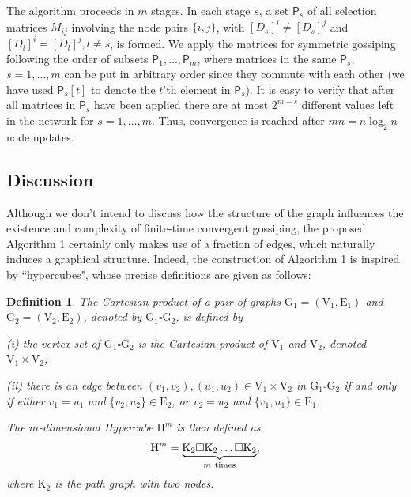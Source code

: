 \documentclass[a4paper, 11pt]{article}
\newtheorem{definition}{Definition}
\begin{document}
The algorithm proceeds in $m$ stages. In each stage $s$, a set $\mathsf{P}_s$ of all selection matrices $M_{ij}$ involving the node pairs  $\{i,j\}$,  with $[D_s]^i \neq [D_s]^j$ and $[D_l]^i=[D_l]^j, l\neq s$, is formed.
We apply the matrices  for symmetric gossiping  following the order of subsets $\mathsf{P}_1,\dots, \mathsf{P}_m$, where matrices in the same  $\mathsf{P}_s$, $s=1,\dots,m$ can be put in arbitrary order since they commute with each other (we have used $\mathsf{P}_s[t]$ to denote the $t$'th element in $\mathsf{P}_s$). It is easy to verify that after all matrices in $\mathsf{P}_s$ have been applied   there are at most $2^{m-s}$ different values left in the network for $s=1,\dots,m$.  Thus, convergence is reached after $mn=n\log_2n$ node updates.




\subsection{Discussion} Although we don't intend to discuss how the structure of the graph influences the existence and complexity of finite-time convergent gossiping, the proposed Algorithm 1 certainly only makes use of a fraction of edges, which naturally induces a graphical structure. Indeed, the construction of Algorithm 1 is inspired by ``hypercubes", whose precise definitions are given as follows:

\medskip

\begin{definition}
The Cartesian product of  a pair of graphs $\mathrm{G}_1=(\mathrm{V}_1,\mathrm{E}_1)$ and $\mathrm{G}_2=(\mathrm{V}_2,\mathrm{E}_2)$, denoted by $\mathrm{G}_1\square\mathrm{G}_2$, is defined by

 (i) the  vertex set of $\mathrm{G}_1\square\mathrm{G}_2$ is the Cartesian product of $\mathrm{V}_1$ and $\mathrm{V}_2$, denoted  $\mathrm{V}_1 \times \mathrm{V}_2$;

  (ii) there is an edge between $(v_1,v_2), (u_1,u_2)\in \mathrm{V}_1 \times \mathrm{V}_2$ in $\mathrm{G}_1\square\mathrm{G}_2$ if and only if either $v_1=u_1$ and $\{v_2,u_2\}\in \mathrm{E}_2$, or $v_2=u_2$ and $\{v_1,u_1\}\in \mathrm{E}_1$.

The  $m$-dimensional Hypercube $\mathrm{H}^{m}$ is then  defined as
\begin{align}
\mathrm{H}^{m}=\underbrace{\mathrm{K}_2\square\mathrm{K}_2 \dots \square\mathrm{K}_2}_{m\  {\rm times}}, \nonumber
\end{align}
where $\mathrm{K}_2$ is the path graph with two nodes.
\end{definition}
\end{document}
